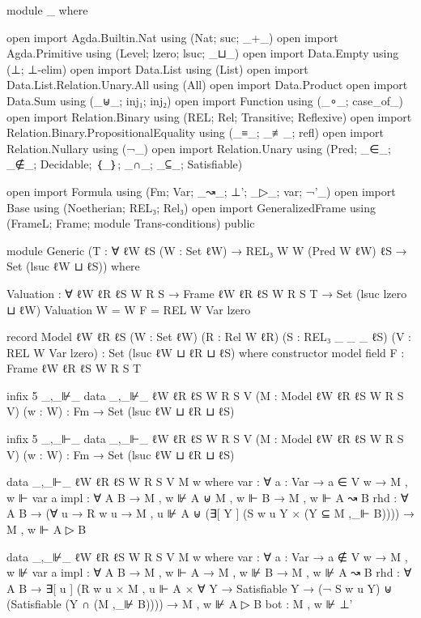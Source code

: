 \begin{spverbatim}
module _ where

open import Agda.Builtin.Nat using (Nat; suc; _+_)
open import Agda.Primitive using (Level; lzero; lsuc; _⊔_)
open import Data.Empty using (⊥; ⊥-elim)
open import Data.List using (List)
open import Data.List.Relation.Unary.All using (All)
open import Data.Product
open import Data.Sum using (_⊎_; inj₁; inj₂)
open import Function using (_∘_; case_of_)
open import Relation.Binary using (REL; Rel; Transitive; Reflexive)
open import Relation.Binary.PropositionalEquality using (_≡_; _≢_; refl)
open import Relation.Nullary using (¬_)
open import Relation.Unary using (Pred; _∈_; _∉_; Decidable; ｛_｝; _∩_; _⊆_; Satisfiable)

open import Formula using (Fm; Var; _↝_; ⊥'; _▷_; var; ¬'_)
open import Base using (Noetherian; REL₃; Rel₃)
open import GeneralizedFrame using (FrameL; Frame; module Trans-conditions) public

module Generic
  (T : ∀ {ℓW ℓS} (W : Set ℓW) → REL₃ W W (Pred W ℓW) ℓS → Set (lsuc ℓW ⊔ ℓS))
  where

  Valuation : ∀ {ℓW ℓR ℓS W R S} → Frame {ℓW} {ℓR} {ℓS} W R S T → Set (lsuc lzero ⊔ ℓW)
  Valuation {W = W} F = REL W Var lzero

  record Model
    {ℓW ℓR ℓS}
    (W : Set ℓW)
    (R : Rel W ℓR)
    (S : REL₃ _ _ _ ℓS)
    (V : REL W Var lzero)
    : Set (lsuc ℓW ⊔ ℓR ⊔ ℓS) where
    constructor model
    field
      F : Frame {ℓW} {ℓR} {ℓS} W R S T

  infix 5 _,_⊮_
  data _,_⊮_ {ℓW ℓR ℓS W R S V} (M : Model {ℓW} {ℓR} {ℓS} W R S V) (w : W)
    : Fm → Set (lsuc ℓW ⊔ ℓR ⊔ ℓS)

  infix 5 _,_⊩_
  data _,_⊩_ {ℓW ℓR ℓS W R S V} (M : Model {ℓW} {ℓR} {ℓS} W R S V) (w : W) : Fm → Set (lsuc ℓW ⊔ ℓR ⊔ ℓS)

  data _,_⊩_ {ℓW} {ℓR} {ℓS} {W} {R} {S} {V} M w where
    var : ∀ {a : Var} → a ∈ V w → M , w ⊩ var a
    impl : ∀ {A B} → M , w ⊮ A ⊎ M , w ⊩ B → M , w ⊩ A ↝ B
    rhd : ∀ {A B} →
      (∀ {u} → R w u → M , u ⊮ A ⊎ (∃[ Y ] (S w u Y × (Y ⊆ M ,_⊩ B))))
      → M , w ⊩ A ▷ B

  data _,_⊮_ {ℓW} {ℓR} {ℓS} {W} {R} {S} {V} M w where
    var : ∀ {a : Var} → a ∉ V w → M , w ⊮ var a
    impl : ∀ {A B} → M , w ⊩ A → M , w ⊮ B → M , w ⊮ A ↝ B
    rhd : ∀ {A B} →
      ∃[ u ] (R w u × M , u ⊩ A
      × ∀ Y → Satisfiable Y → (¬ S w u Y) ⊎ (Satisfiable (Y ∩ (M ,_⊮ B))))
      → M , w ⊮ A ▷ B
    bot : M , w ⊮ ⊥'


\end{spverbatim}
